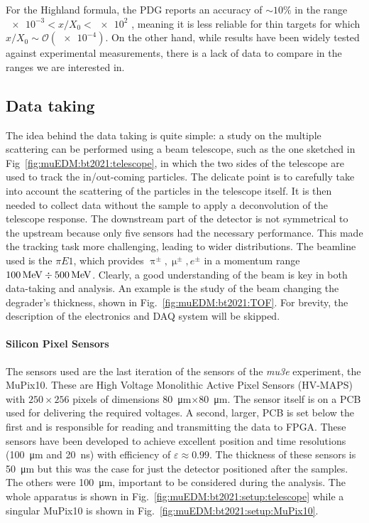 \begin{refsection}
        \noindent
        For the Highland formula, the PDG reports an accuracy of $\sim 10\%$ in the range $\num{e-3}<x/X_0<\num{e2}$ \cite{PDG}, meaning it is less reliable for thin targets for which $x/X_0 \sim \mathcal{O}(\num{e-4})$.
        On the other hand, while \gf results have been widely tested against experimental measurements, there is a lack of data to compare in the ranges we are interested in.

    \subsection{Data taking}
        The idea behind the data taking is quite simple: a study on the multiple scattering can be performed using a beam telescope, such as the one sketched in Fig~\ref{fig:muEDM:bt2021:telescope}, in which the two sides of the telescope are used to track the in/out-coming particles. 
        The delicate point is to carefully take into account the scattering of the particles in the telescope itself. 
        It is then needed to collect data without the sample to apply a deconvolution of the telescope response.
        The downstream part of the detector is not symmetrical to the upstream because only five sensors had the necessary performance. This made the tracking task more challenging, leading to wider distributions.
        The beamline used is the $\pi E1$, which provides $\uppi^\pm,\upmu^\pm,e^\pm$ in a momentum range $\SI{100}{MeV}\divisionsymbol\SI{500}{MeV}$.
        Clearly, a good understanding of the beam is key in both data-taking and analysis. 
        An example is the study of the beam changing the degrader's thickness, shown in Fig.~\ref{fig:muEDM:bt2021:TOF}.
        For brevity, the description of the electronics and DAQ system will be skipped. 

        \paragraph{Silicon Pixel Sensors}
        The sensors used are the last iteration of the sensors of the \textit{mu3e} experiment, the MuPix10. 
        These are High Voltage Monolithic Active Pixel Sensors (HV-MAPS) with $250\times256$ pixels of dimensions \SI{80}{\micro m}$\times$\SI{80}{\micro m}. 
        The sensor itself is on a PCB used for delivering the required voltages.
        A second, larger, PCB is set below the first and is responsible for reading and transmitting the data to FPGA.
        These sensors have been developed to achieve excellent position and time resolutions (\SI{100}{\micro m} and \SI{20}{ns}) with efficiency of $\varepsilon \approx 0.99$. 
        The thickness of these sensors is \SI{50}{\micro m} but this was the case for just the detector positioned after the samples. 
        The others were \SI{100}{\micro m}, important to be considered during the analysis.
        The whole apparatus is shown in Fig.~\ref{fig:muEDM:bt2021:setup:telescope} while a singular MuPix10 is shown in Fig.~\ref{fig:muEDM:bt2021:setup:MuPix10}.
        

\end{refsection}

